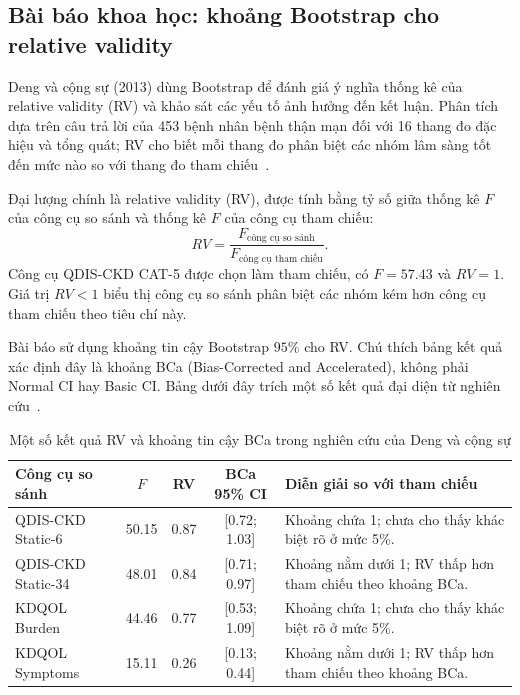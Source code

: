 \documentclass[12pt,a4paper]{article}
\theoremstyle{definition}
\numberwithin{equation}{section}
\begin{document}
\subsection{Bài báo khoa học: khoảng Bootstrap cho relative validity}

Deng và cộng sự (2013) dùng Bootstrap để đánh giá ý nghĩa thống kê của
relative validity (RV) và khảo sát các yếu tố ảnh hưởng đến kết luận.
Phân tích dựa trên câu trả lời của 453 bệnh nhân bệnh thận mạn đối với 16
thang đo đặc hiệu và tổng quát; RV cho biết mỗi thang đo phân biệt các
nhóm lâm sàng tốt đến mức nào so với thang đo tham chiếu~\cite[tr. 2--4]{deng2013}.

Đại lượng chính là relative validity (RV), được tính bằng tỷ số giữa
thống kê $F$ của công cụ so sánh và thống kê $F$ của công cụ tham chiếu:
\[
RV =
\frac{F_{\text{công cụ so sánh}}}
{F_{\text{công cụ tham chiếu}}}.
\]
Công cụ QDIS-CKD CAT-5 được chọn làm tham chiếu, có $F=57.43$ và
$RV=1$. Giá trị $RV<1$ biểu thị công cụ so sánh phân biệt các nhóm kém
hơn công cụ tham chiếu theo tiêu chí này.

Bài báo sử dụng khoảng tin cậy Bootstrap $95\%$ cho RV. Chú thích bảng
kết quả xác định đây là khoảng BCa (Bias-Corrected and Accelerated),
không phải Normal CI hay Basic CI. Bảng dưới đây trích một số kết quả
đại diện từ nghiên cứu~\cite[Bảng 1, tr.~3]{deng2013}.

\begin{table}[htbp]
	\centering
	\small
	\renewcommand{\arraystretch}{1.2}
	\setlength{\tabcolsep}{6pt}
	\caption{Một số kết quả RV và khoảng tin cậy BCa trong nghiên cứu của Deng và cộng sự}
	\label{tab:deng-bca}
	\begin{tabular}{l c c c >{\raggedright\arraybackslash}p{6.8cm}}
		\toprule
		\textbf{Công cụ so sánh} &
		\textbf{$F$} &
		\textbf{RV} &
		\textbf{BCa 95\% CI} &
		\textbf{Diễn giải so với tham chiếu} \\
		\midrule
		QDIS-CKD Static-6 & 50.15 & 0.87 & [0.72; 1.03] &
		Khoảng chứa 1; chưa cho thấy khác biệt rõ ở mức 5\%. \\

		QDIS-CKD Static-34 & 48.01 & 0.84 & [0.71; 0.97] &
		Khoảng nằm dưới 1; RV thấp hơn tham chiếu theo khoảng BCa. \\

		KDQOL Burden & 44.46 & 0.77 & [0.53; 1.09] &
		Khoảng chứa 1; chưa cho thấy khác biệt rõ ở mức 5\%. \\

		KDQOL Symptoms & 15.11 & 0.26 & [0.13; 0.44] &
		Khoảng nằm dưới 1; RV thấp hơn tham chiếu theo khoảng BCa. \\
		\bottomrule
	\end{tabular}
\end{table}
\end{document}
